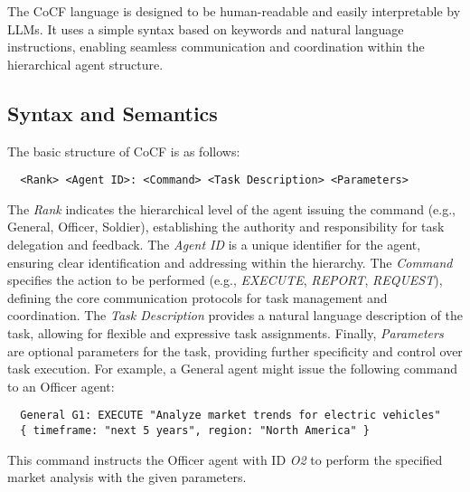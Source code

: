 The CoCF language is designed to be human-readable and easily interpretable by
LLMs. It uses a simple syntax based on keywords and natural language instructions,
enabling seamless communication and coordination within the hierarchical agent
structure.

\subsection{Syntax and Semantics}

The basic structure of CoCF is as follows:

\begin{verbatim}
  <Rank> <Agent ID>: <Command> <Task Description> <Parameters>
\end{verbatim}

The \textit{Rank} indicates the hierarchical level of the agent issuing the command
(e.g., General, Officer, Soldier), establishing the authority and responsibility
for task delegation and feedback. The \textit{Agent ID} is a unique identifier
for the agent, ensuring clear identification and addressing within the hierarchy.
The \textit{Command} specifies the action to be performed (e.g., \textit{EXECUTE},
\textit{REPORT}, \textit{REQUEST}), defining the core communication protocols for
task management and coordination. The \textit{Task Description} provides a natural
language description of the task, allowing for flexible and expressive task
assignments. Finally, \textit{Parameters} are optional parameters for the task,
providing further specificity and control over task execution. For example, a
General agent might issue the following command to an Officer agent:

\begin{verbatim}
  General G1: EXECUTE "Analyze market trends for electric vehicles"
  { timeframe: "next 5 years", region: "North America" }
\end{verbatim}

This command instructs the Officer agent with ID \textit{O2} to perform the
specified market analysis with the given parameters.

